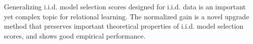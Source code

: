 \documentclass[letterpaper]{article}
\begin{document}
Generalizing i.i.d. model selection scores designed for i.i.d. data is an important yet complex topic for relational learning. The normalized gain is a novel upgrade method that preserves important theoretical properties of i.i.d. model selection scores, and shows good empirical performance. 








\end{document}
